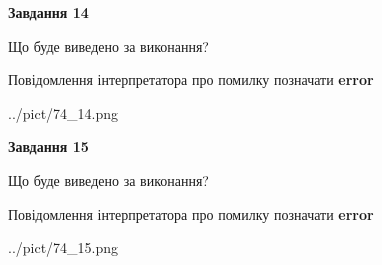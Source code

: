 \documentclass[11pt, ukrainian]{article}
\begin{document}
{\begin {large}
{\begin {center}\textbf{Завдання 14}\end {center}}\par
Що буде виведено за виконання? \par
Повідомлення інтерпретатора про помилку позначати \textbf{error}

\begin{center}
	{../pict/74_14.png}
\end{center}
\newpage

{\begin {center}\textbf{Завдання 15}\end {center}}\par
Що буде виведено за виконання? \par
Повідомлення інтерпретатора про помилку позначати \textbf{error}

\begin{center}
	{../pict/74_15.png}
\end{center}
\newpage

\end {large}}
\end{document}
